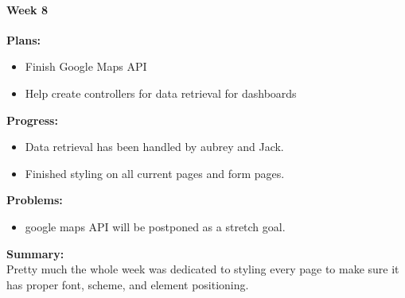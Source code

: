 \paragraph{Week 8}
\begin{adjustwidth}{2.5em}{0pt}
    \vspace{-0.5cm}\textbf{Plans:}
    \vspace{-0.5cm}
    \begin{itemize}
        \item Finish Google Maps API
        \item Help create controllers for data retrieval  for dashboards

    \end{itemize} 
    \vspace{-0.3cm}\textbf{Progress:}
    \vspace{-0.5cm}
    \begin{itemize}
        \item Data retrieval has been handled by aubrey and Jack.
        \item Finished styling on all current pages and form pages. 
    \end{itemize} 
    \vspace{-0.3cm}\textbf{Problems:}
    \vspace{-0.5cm}
    \begin{itemize}
        \item google maps API will be postponed as a stretch goal.
    \end{itemize}  
    \vspace{-0.3cm}\noindent\textbf{Summary:}\\
    \noindent Pretty much the whole week was dedicated to styling every page to make sure it has proper font, scheme, and element positioning.
\end{adjustwidth} 
